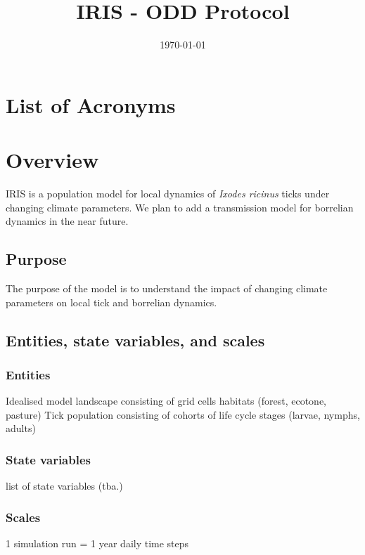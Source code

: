 \documentclass[a4paper, 11pt]{scrartcl}
\title{IRIS - ODD Protocol}
\author{}
\date{\today}
\begin{document}
\maketitle
\tableofcontents

\newpage
\listoffigures
\listoftables

\section*{List of Acronyms}
\begin{acronym}
\end{acronym}


\clearpage
\section{Overview}
IRIS is a population model for local dynamics of \textit{Ixodes ricinus} ticks under changing climate parameters.
We plan to add a transmission model for borrelian dynamics in the near future.


\subsection{Purpose}
The purpose of the model is to understand the impact of changing climate parameters on local tick and borrelian dynamics. 


\subsection{Entities, state variables, and scales}

\subsubsection{Entities}
Idealised model landscape consisting of grid cells 
habitats (forest, ecotone, pasture)
Tick population consisting of cohorts of life cycle stages (larvae, nymphs, adults)


\subsubsection{State variables}

list of state variables (tba.)


\subsubsection{Scales}
1 simulation run = 1 year 
daily time steps
\end{document}
